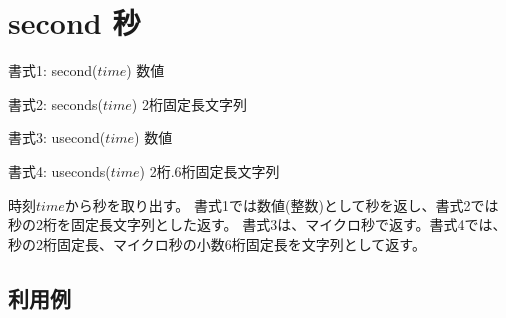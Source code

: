 
%

\section{second 秒\label{sect:second}}

書式1: second($time$) 数値

書式2: seconds($time$) 2桁固定長文字列

書式3: usecond($time$) 数値

書式4: useconds($time$) 2桁.6桁固定長文字列

時刻$time$から秒を取り出す。
書式1では数値(整数)として秒を返し、書式2では秒の2桁を固定長文字列とした返す。
書式3は、マイクロ秒で返す。書式4では、秒の2桁固定長、マイクロ秒の小数6桁固定長を文字列として返す。

\subsection*{利用例}


%

